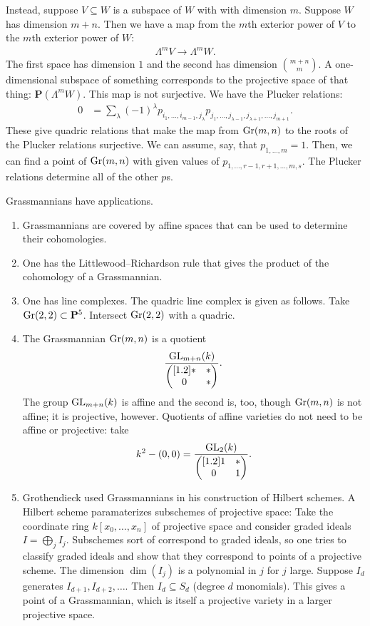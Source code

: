 \documentclass[11pt, oneside,margin=1in]{article}
\begin{document}
Instead, suppose $V\subseteq W$ is a subspace of $W$ with with dimension $m$. Suppose $W$ has dimension $m+n$. Then we have a map from the $m$th exterior power of $V$ to the $m$th exterior power of $W$:
\begin{align*}
	\Lambda^m V \longrightarrow  \Lambda ^m W.
\end{align*}
The first space has dimension $1$ and the second has dimension $\binom{m+n}{m}$. A one-dimensional subspace of something corresponds to the projective space of that thing: $\mathbf{P}(\Lambda^m W)$. This map is not surjective. We have the Plucker relations:
\begin{align*}
	0 &= \sum_{\lambda}^{} (-1)^\lambda p_{i_1,\hdots, i_{m-1},j_\lambda} p_{j_1,\hdots, j_{\lambda -1},j_{\lambda+1},\hdots, j_{m+1}}.
\end{align*}
These give quadric relations that make the map from $\operatorname{Gr}(m,n)$ to the roots of the Plucker relations surjective. We can assume, say, that $p_{1,\hdots, m} = 1$. Then, we can find a point of $\operatorname{Gr}(m,n)$ with given values of $p_{1,\hdots, r-1,r+1,\hdots, m,s}$. The Plucker relations determine all of the other $p$s.

Grassmannians have applications.
\begin{enumerate}
	\item Grassmannians are covered by affine spaces that can be used to determine their cohomologies.
	\item One has the Littlewood--Richardson rule that gives the product of the cohomology of a Grassmannian.
	\item One has line complexes. The quadric line complex is given as follows. Take $\operatorname{Gr}(2,2)\subset  \mathbf{P}^5$. Intersect $\operatorname{Gr}(2,2)$ with a quadric.
	\item The Grassmannian $\operatorname{Gr}(m,n)$ is a quotient \[\frac{\operatorname{GL}_{m+n}(k)}{\begin{pmatrix} [ 1.2 ] *&*\\0&*\end{pmatrix}}.\] The group $\operatorname{GL}_{m+n}(k)$ is affine and the second is, too, though $\operatorname{Gr}(m,n)$ is not affine; it is projective, however. Quotients of affine varieties do not need to be affine or projective: take 
		\begin{align*}
			k^2 - (0,0) =  \frac{\operatorname{GL}_{2}(k) }{\begin{pmatrix} [ 1.2 ] 1&*\\0&1\end{pmatrix}}.
		\end{align*}
	\item Grothendieck used Grassmannians in his construction of Hilbert schemes. A Hilbert scheme paramaterizes subschemes of projective space: Take the coordinate ring $k[x_0,\hdots, x_n]$ of projective space and consider graded ideals $I = \bigoplus_j I_j$. Subschemes sort of correspond to graded ideals, so one tries to classify graded ideals and show that they correspond to points of a projective scheme. The dimension $\dim (I_j)$ is a polynomial in $j$ for $j$ large. Suppose $I_d$ generates $I_{d+1},I_{d+2},\hdots$. Then $I_d \subseteq S_d$ (degree $d$ monomials). This gives a point of a Grassmannian, which is itself a projective variety in a larger projective space.
\end{enumerate}
\end{document}
